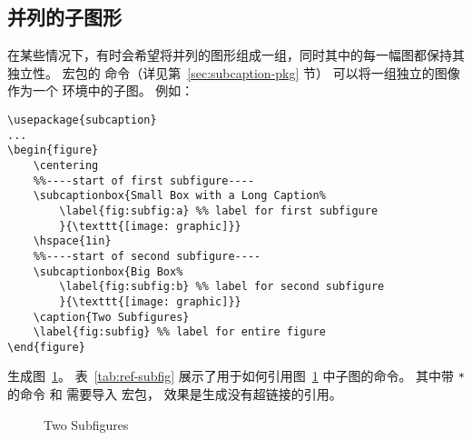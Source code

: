 \subsection{并列的子图形}\label{ssec:sidesubfigure}

在某些情况下，有时会希望将并列的图形组成一组，同时其中的每一幅图都保持其独立性。
 宏包的  命令（详见第~\ref{sec:subcaption-pkg} 节）
可以将一组独立的图像作为一个  环境中的子图。
例如：
\begin{lstlisting}
\usepackage{subcaption}
...
\begin{figure}
	\centering
	%%----start of first subfigure----
	\subcaptionbox{Small Box with a Long Caption%
		\label{fig:subfig:a} %% label for first subfigure
		}{\texttt{[image: graphic]}}
	\hspace{1in}
	%%----start of second subfigure----
	\subcaptionbox{Big Box%
		\label{fig:subfig:b} %% label for second subfigure
		}{\texttt{[image: graphic]}}
	\caption{Two Subfigures}
	\label{fig:subfig} %% label for entire figure
\end{figure}
\end{lstlisting}
生成图~\ref{fig:subfig}。
表~\ref{tab:ref-subfig} 展示了用于如何引用图~\ref{fig:subfig} 中子图的命令。
其中带 \texttt{*} 的命令  和  需要导入  宏包，
效果是生成没有超链接的引用。

\begin{figure}
	\centering
	\hspace{1in}
	\caption{Two Subfigures}
	\label{fig:subfig} %
\end{figure}


